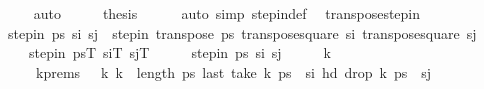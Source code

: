 \begin{isabellebody}
\ \ \ \ \isamarkupfalse%
\ auto\isanewline
\ \ \isamarkupfalse%
\ \isamarkupfalse%
\ {\isacharquery}{\kern0pt}thesis\isanewline
\ \ \ \ \isamarkupfalse%
\ {\isacharparenleft}{\kern0pt}auto\ simp{\isacharcolon}{\kern0pt}\ step{\isacharunderscore}{\kern0pt}in{\isacharunderscore}{\kern0pt}def{\isacharparenright}{\kern0pt}\ \isanewline
{}\isamarkupfalse%
%
\endisatagproof
{\isafoldproof}%
%
\isadelimproof
\isanewline
%
\endisadelimproof
\isanewline
{}\isamarkupfalse%
\ transpose{\isacharunderscore}{\kern0pt}step{\isacharunderscore}{\kern0pt}in{\isacharcolon}{\kern0pt}\ \isanewline
\ \ {\isachardoublequoteopen}step{\isacharunderscore}{\kern0pt}in\ ps\ s\isactrlsub i\ s\isactrlsub j\ {\isasymLongrightarrow}\ step{\isacharunderscore}{\kern0pt}in\ {\isacharparenleft}{\kern0pt}transpose\ ps{\isacharparenright}{\kern0pt}\ {\isacharparenleft}{\kern0pt}transpose{\isacharunderscore}{\kern0pt}square\ s\isactrlsub i{\isacharparenright}{\kern0pt}\ {\isacharparenleft}{\kern0pt}transpose{\isacharunderscore}{\kern0pt}square\ s\isactrlsub j{\isacharparenright}{\kern0pt}{\isachardoublequoteclose}\isanewline
\ \ {\isacharparenleft}{\kern0pt}\ {\isachardoublequoteopen}{\isacharunderscore}{\kern0pt}\ {\isasymLongrightarrow}\ step{\isacharunderscore}{\kern0pt}in\ {\isacharquery}{\kern0pt}psT\ {\isacharquery}{\kern0pt}s\isactrlsub iT\ {\isacharquery}{\kern0pt}s\isactrlsub jT{\isachardoublequoteclose}{\isacharparenright}{\kern0pt}\isanewline
%
\isadelimproof
%
\endisadelimproof
%
\isatagproof
{}\isamarkupfalse%
\ {\isacharminus}{\kern0pt}\isanewline
\ \ \isamarkupfalse%
\ {\isachardoublequoteopen}step{\isacharunderscore}{\kern0pt}in\ ps\ s\isactrlsub i\ s\isactrlsub j{\isachardoublequoteclose}\isanewline
\ \ \isamarkupfalse%
\ \isamarkupfalse%
\ k\ \ \isanewline
\ \ \ \ \ \ k{\isacharunderscore}{\kern0pt}prems{\isacharcolon}{\kern0pt}\ {\isachardoublequoteopen}{}\ {\isacharless}{\kern0pt}\ k{\isachardoublequoteclose}\ {\isachardoublequoteopen}k\ {\isacharless}{\kern0pt}\ length\ ps{\isachardoublequoteclose}\ {\isachardoublequoteopen}last\ {\isacharparenleft}{\kern0pt}take\ k\ ps{\isacharparenright}{\kern0pt}\ {\isacharequal}{\kern0pt}\ s\isactrlsub i{\isachardoublequoteclose}\ {\isachardoublequoteopen}hd\ {\isacharparenleft}{\kern0pt}drop\ k\ ps{\isacharparenright}{\kern0pt}\ {\isacharequal}{\kern0pt}\ s\isactrlsub j{\isachardoublequoteclose}\isanewline
\ \ \ \ \isamarkupfalse%

\end{isabellebody}
